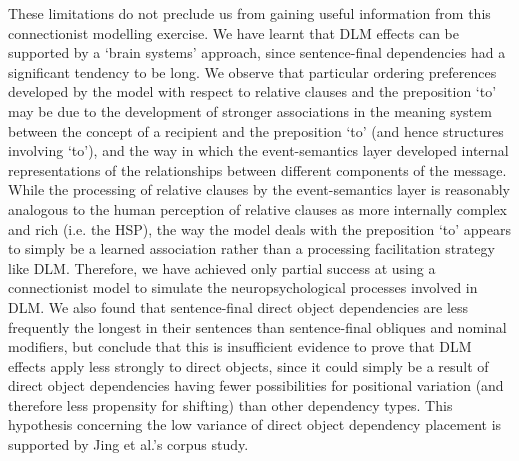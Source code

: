 \documentclass{article}
\begin{document}
These limitations do not preclude us from gaining useful information from this connectionist modelling exercise. We have learnt that DLM effects can be supported by a `brain systems' approach, since sentence-final dependencies had a significant tendency to be long. We observe that particular ordering preferences developed by the model with respect to relative clauses and the preposition `to' may be due to the development of stronger associations in the meaning system between the concept of a recipient and the preposition `to' (and hence structures involving `to'), and the way in which the event-semantics layer developed internal representations of the relationships between different components of the message. While the processing of relative clauses by the event-semantics layer is reasonably analogous to the human perception of relative clauses as more internally complex and rich (i.e. the HSP), the way the model deals with the preposition `to' appears to simply be a learned association rather than a processing facilitation strategy like DLM. Therefore, we have achieved only partial success at using a connectionist model to simulate the neuropsychological processes involved in DLM. We also found that sentence-final direct object dependencies are less frequently the longest in their sentences than sentence-final obliques and nominal modifiers, but conclude that this is insufficient evidence to prove that DLM effects apply less strongly to direct objects, since it could simply be a result of direct object dependencies having fewer possibilities for positional variation (and therefore less propensity for shifting) than other dependency types. This hypothesis concerning the low variance of direct object dependency placement is supported by Jing et al.'s corpus study.
\end{document}
